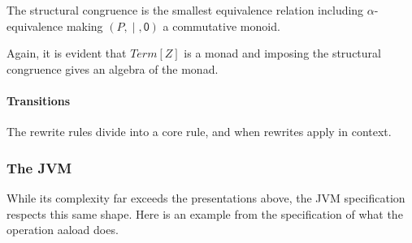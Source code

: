 The structural congruence is the smallest equivalence relation including $\alpha$-equivalence making $(P,\;\mathsf{|}\;,\mathsf{0})$ a commutative monoid.

Again, it is evident that $Term[Z]$ is a monad and imposing the structural congruence gives an algebra of the monad.

\paragraph{Transitions}
The rewrite rules divide into a core rule, and when rewrites apply in
context.

\pagebreak
\subsubsection{The JVM}

While its complexity far exceeds the presentations above, the JVM specification respects this same shape. Here is an example from the specification of what the operation aaload does.

